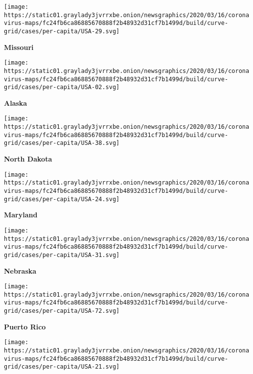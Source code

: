 \texttt{[image: https://static01.graylady3jvrrxbe.onion/newsgraphics/2020/03/16/coronavirus-maps/fc24fb6ca86885670888f2b48932d31cf7b1499d/build/curve-grid/cases/per-capita/USA-29.svg]}

\textbf{Missouri}

\href{https://www.nytimes3xbfgragh.onion/interactive/2020/us/alaska-coronavirus-cases.html}{}

\texttt{[image: https://static01.graylady3jvrrxbe.onion/newsgraphics/2020/03/16/coronavirus-maps/fc24fb6ca86885670888f2b48932d31cf7b1499d/build/curve-grid/cases/per-capita/USA-02.svg]}

\textbf{Alaska}

\href{https://www.nytimes3xbfgragh.onion/interactive/2020/us/north-dakota-coronavirus-cases.html}{}

\texttt{[image: https://static01.graylady3jvrrxbe.onion/newsgraphics/2020/03/16/coronavirus-maps/fc24fb6ca86885670888f2b48932d31cf7b1499d/build/curve-grid/cases/per-capita/USA-38.svg]}

\textbf{North Dakota}

\href{https://www.nytimes3xbfgragh.onion/interactive/2020/us/maryland-coronavirus-cases.html}{}

\texttt{[image: https://static01.graylady3jvrrxbe.onion/newsgraphics/2020/03/16/coronavirus-maps/fc24fb6ca86885670888f2b48932d31cf7b1499d/build/curve-grid/cases/per-capita/USA-24.svg]}

\textbf{Maryland}

\href{https://www.nytimes3xbfgragh.onion/interactive/2020/us/nebraska-coronavirus-cases.html}{}

\texttt{[image: https://static01.graylady3jvrrxbe.onion/newsgraphics/2020/03/16/coronavirus-maps/fc24fb6ca86885670888f2b48932d31cf7b1499d/build/curve-grid/cases/per-capita/USA-31.svg]}

\textbf{Nebraska}

\href{https://www.nytimes3xbfgragh.onion/interactive/2020/us/puerto-rico-coronavirus-cases.html}{}

\texttt{[image: https://static01.graylady3jvrrxbe.onion/newsgraphics/2020/03/16/coronavirus-maps/fc24fb6ca86885670888f2b48932d31cf7b1499d/build/curve-grid/cases/per-capita/USA-72.svg]}

\textbf{Puerto Rico}

\href{https://www.nytimes3xbfgragh.onion/interactive/2020/us/kentucky-coronavirus-cases.html}{}

\texttt{[image: https://static01.graylady3jvrrxbe.onion/newsgraphics/2020/03/16/coronavirus-maps/fc24fb6ca86885670888f2b48932d31cf7b1499d/build/curve-grid/cases/per-capita/USA-21.svg]}


